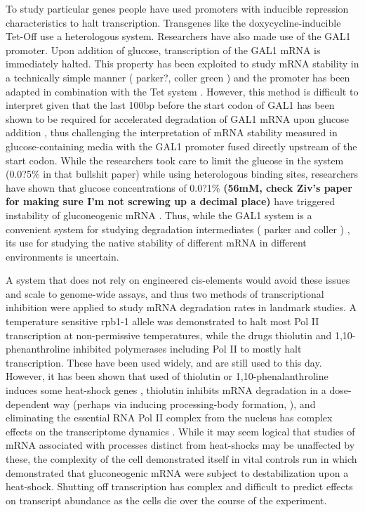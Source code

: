 To study
particular genes people have used promoters with inducible repression
characteristics to halt transcription. Transgenes like the
doxycycline-inducible Tet-Off 
\parencite{gari1997set} use a heterologous
system. Researchers have also made use of the GAL1 promoter. Upon
addition of glucose, transcription of the GAL1 mRNA is immediately
halted. This property has been exploited to study mRNA stability in a
technically simple manner 
( parker?, coller green )
and the promoter
has been adapted in combination with the Tet system 
\parencite{baudrimont2017multiplexed}. 
However, this method is difficult to interpret given that 
the last 100bp before the start
codon of GAL1 has been shown to be required for accelerated
degradation of GAL1 mRNA upon glucose addition 
\parencite{baumgartner2011antagonistic},
thus challenging the interpretation of mRNA stability measured in
glucose-containing media with the GAL1 promoter fused directly
upstream of the start codon. While the researchers took care to limit
the glucose in the system (0.0?5\% in that bullshit paper) while using
heterologous binding sites, researchers have shown that glucose
concentrations of 0.0?1\% 
\textbf{(56mM, check Ziv’s paper for making sure I’m
not screwing up a decimal place)} have triggered instability of
gluconeogenic mRNA
\textbf{\parencite{yin2000differential,yin2003glucose}}. 
Thus, while the GAL1
system is a convenient system for studying degradation intermediates 
( parker and coller )
, its use for studying the native stability of
different mRNA in different environments is uncertain.  

A system
that does not rely on engineered cis-elements would avoid these issues
and scale to genome-wide assays, and thus two methods of
transcriptional inhibition were applied to study mRNA degradation
rates in landmark studies. A temperature sensitive rpb1-1 allele was
demonstrated to halt most Pol II transcription at non-permissive
temperatures, while the drugs thiolutin and 1,10-phenanthroline
inhibited polymerases including Pol II to mostly halt transcription.
These have been used widely, and are still used to this day. However,
it has been shown that used of thiolutin or 1,10-phenalanthroline
induces some heat-shock genes \parencite{adams1991yeast}, thiolutin
inhibits mRNA degradation in a dose-dependent way 
\parencite{pelechano2008transcriptional}
(perhaps via inducing processing-body formation,
\cite{huch2016decapping}), 
and eliminating the essential RNA Pol II complex
from the nucleus has complex effects on the transcriptome dynamics 
\parencite{yu2016rna}. While it may seem logical that studies of mRNA
associated with processes distinct from heat-shocks may be unaffected
by these, the complexity of the cell demonstrated itself in vital
controls run in \cite{mercado1994levels} which demonstrated that
gluconeogenic mRNA were subject to destabilization upon a
heat-shock. Shutting off transcription has complex and difficult to
predict effects on transcript abundance as the cells die over the
course of the experiment.  

